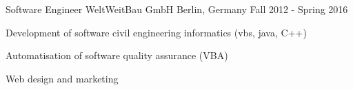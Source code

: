 \begin{cventries}
  \cventry
    {Software Engineer} %
    {WeltWeitBau GmbH} %
    {Berlin, Germany} %
    {Fall 2012 - Spring 2016} %
    {
      \begin{cvitems} %
        \item {Development of software civil engineering informatics (vbs, java, C++)}
        \item {Automatisation of software quality assurance (VBA)}
        \item {Web design and marketing}
      \end{cvitems}
    }


\end{cventries}
